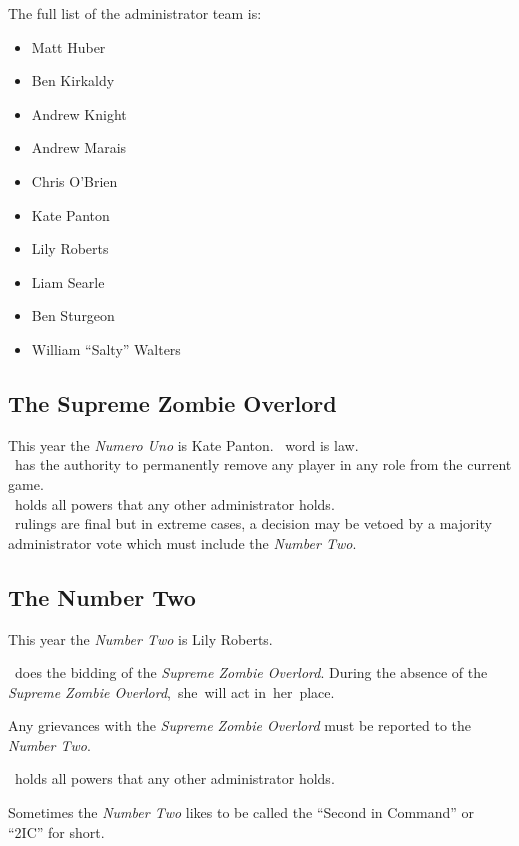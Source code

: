 \documentclass[a4paper,12pt]{article}
\newcommand{\SZO}{Kate Panton}
\newcommand{\SZOSP}{she}
\newcommand{\SZOOP}{her}
\newcommand{\SIC}{Lily Roberts}
\newcommand{\SICSP}{she}
\begin{document}
The full list of the administrator team is:
\label{Admins}
\begin{itemize}
    \item {Matt Huber}
    \item {Ben Kirkaldy}
    \item {Andrew Knight}
    \item {Andrew Marais}
    \item {Chris O'Brien}
    \item {Kate Panton}
    \item {Lily Roberts}
    \item {Liam Searle}
    \item {Ben Sturgeon}
    \item {William ``Salty'' Walters} 
\end{itemize}

\subsection{The Supreme Zombie Overlord}

This year the \emph{Numero Uno} is \SZO. \titlecap{\SZOOP}~word is law.\\

\titlecap{\SZOSP}~has the authority to permanently remove any player in any role from the current game.\\

\titlecap{\SZOSP}~holds all powers that any other administrator holds.\\

\titlecap{\SZOOP}~rulings are final but in extreme cases, a decision may be vetoed by a majority administrator vote which must include the \emph{Number Two}.

\subsection{The Number Two}

This year the \emph{Number Two} is \SIC.

\titlecap{\SICSP}~does the bidding of the \emph{Supreme Zombie Overlord}. During the absence of the \emph{Supreme Zombie Overlord},~\SICSP~will act in~\SZOOP~place.

Any grievances with the \emph{Supreme Zombie Overlord} must be reported to the \emph{Number Two}.

\titlecap{\SICSP}~holds all powers that any other administrator holds.

Sometimes the \emph{Number Two} likes to be called the ``Second in Command'' or ``2IC'' for short.
\end{document}
